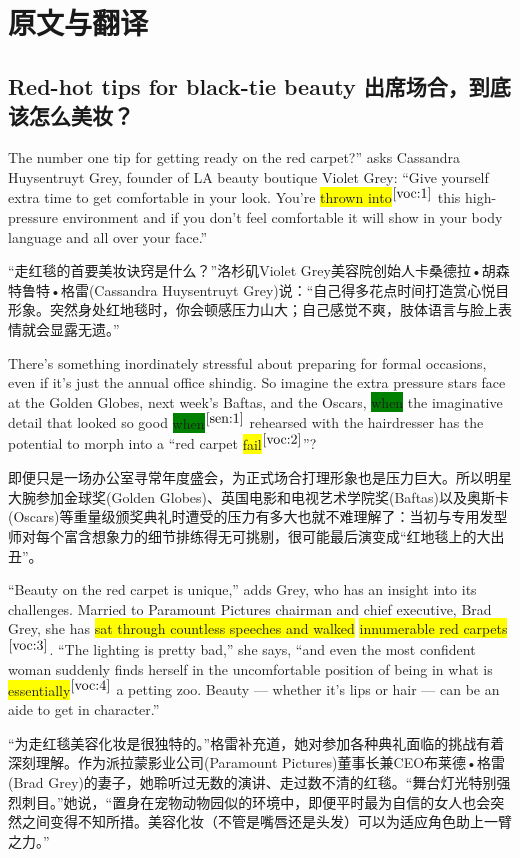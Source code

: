 \documentclass[UTF8]{ctexart}
\begin{document}
\section{原文与翻译}
\subsection{Red-hot tips for black-tie beauty 出席场合，到底该怎么美妆？}

The number one tip for getting ready on the red carpet?” asks Cassandra Huysentruyt Grey, founder of LA beauty boutique Violet Grey: “Give yourself extra time to get comfortable in your look. You’re \colorbox{yellow}{thrown into}$^{\ref{voc:1}}$ this high-pressure environment and if you don’t feel comfortable it will show in your body language and all over your face.”

“走红毯的首要美妆诀窍是什么？”洛杉矶Violet Grey美容院创始人卡桑德拉•胡森特鲁特•格雷(Cassandra Huysentruyt Grey)说：“自己得多花点时间打造赏心悦目形象。突然身处红地毯时，你会顿感压力山大；自己感觉不爽，肢体语言与脸上表情就会显露无遗。”

There’s something inordinately stressful about preparing for formal occasions, even if it’s just the annual office shindig. So imagine the extra pressure stars face at the Golden Globes, next week’s Baftas, and the Oscars, \colorbox{green}{when} the imaginative detail that looked so good \colorbox{green}{when}$^{\ref{sen:1}}$ rehearsed with the hairdresser has the potential to morph into a “red carpet \colorbox{yellow}{fail}$^{\ref{voc:2}}$”?

即便只是一场办公室寻常年度盛会，为正式场合打理形象也是压力巨大。所以明星大腕参加金球奖(Golden Globes)、英国电影和电视艺术学院奖(Baftas)以及奥斯卡(Oscars)等重量级颁奖典礼时遭受的压力有多大也就不难理解了：当初与专用发型师对每个富含想象力的细节排练得无可挑剔，很可能最后演变成“红地毯上的大出丑”。


“Beauty on the red carpet is unique,” adds Grey, who has an insight into its challenges. Married to Paramount Pictures chairman and chief executive, Brad Grey, she has \colorbox{yellow}{sat through countless speeches and walked} \colorbox{yellow}{innumerable red carpets}$^{\ref{voc:3}}$. “The lighting is pretty bad,” she says, “and even the most confident woman suddenly finds herself in the uncomfortable position of being in what is \colorbox{yellow}{essentially}$^{\ref{voc:4}}$ a petting zoo. Beauty — whether it’s lips or hair — can be an aide to get in character.”

“为走红毯美容化妆是很独特的。”格雷补充道，她对参加各种典礼面临的挑战有着深刻理解。作为派拉蒙影业公司(Paramount Pictures)董事长兼CEO布莱德•格雷(Brad Grey)的妻子，她聆听过无数的演讲、走过数不清的红毯。“舞台灯光特别强烈刺目。”她说，“置身在宠物动物园似的环境中，即便平时最为自信的女人也会突然之间变得不知所措。美容化妆（不管是嘴唇还是头发）可以为适应角色助上一臂之力。”
\end{document}
